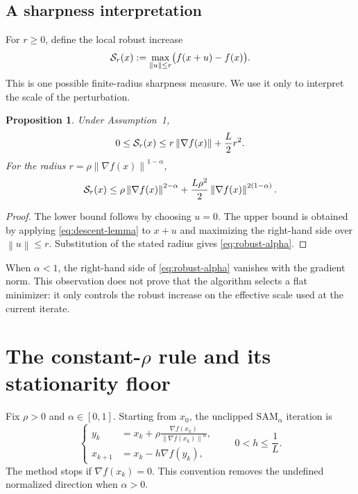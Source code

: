 \documentclass[11pt]{article}
\newtheorem{proposition}[theorem]{Proposition}
\theoremstyle{remark}
\newcommand{\norm}[1]{\left\lVert #1\right\rVert}
\newcommand{\SAMa}{\mathrm{SAM}_{\alpha}}
\begin{document}
\subsection{A  sharpness interpretation}

For $r\geq0$, define the local robust increase
\begin{equation}\label{eq:robust-increase}
  {\cal S}_r(x):=
  \max_{\norm{u}\leq r}\bigl(f(x+u)-f(x)\bigr).
\end{equation}
This is one possible finite-radius sharpness measure.  We use it only to
interpret the scale of the perturbation.

\begin{proposition}\label{prop:robust-bound}
Under Assumption~1,
\begin{equation}\label{eq:robust-bound}
  0\leq{\cal S}_r(x)
  \leq r\norm{\nabla f(x)}+\frac L2r^2.
\end{equation}
For the radius $r=\rho\norm{\nabla f(x)}^{1-\alpha}$,
\begin{equation}\label{eq:robust-alpha}
 {\cal S}_r(x)
 \leq
 \rho\norm{\nabla f(x)}^{2-\alpha}
 +\frac{L\rho^2}{2}\norm{\nabla f(x)}^{2(1-\alpha)}.
\end{equation}
\end{proposition}

\begin{proof}
The lower bound follows by choosing $u=0$.  The upper bound is obtained by
applying \eqref{eq:descent-lemma} to $x+u$ and maximizing the right-hand side
over $\norm{u}\leq r$.  Substitution of the stated radius gives
\eqref{eq:robust-alpha}.
\end{proof}

When $\alpha<1$, the right-hand side of \eqref{eq:robust-alpha} vanishes
with the gradient norm.  This observation does not prove that the algorithm
selects a flat minimizer: it only controls the robust increase on the
effective scale used at the current iterate.

\section{The \texorpdfstring{constant-$\rho$}{constant-rho} rule and its
stationarity floor}\label{sec3}

Fix $\rho>0$ and $\alpha\in[0,1]$.  Starting from $x_0$, the
unclipped $\SAMa$ iteration is
\begin{equation}\label{eq:samalpha}
\left\{
\begin{aligned}
 y_k&=x_k+\rho
 \frac{\nabla f(x_k)}{\norm{\nabla f(x_k)}^\alpha},\\
 x_{k+1}&=x_k-h\nabla f(y_k),
\end{aligned}
\right.
\qquad 0<h\leq\frac1L.
\end{equation}
The method stops if $\nabla f(x_k)=0$.  This convention removes the
undefined normalized direction when $\alpha>0$.
\end{document}
